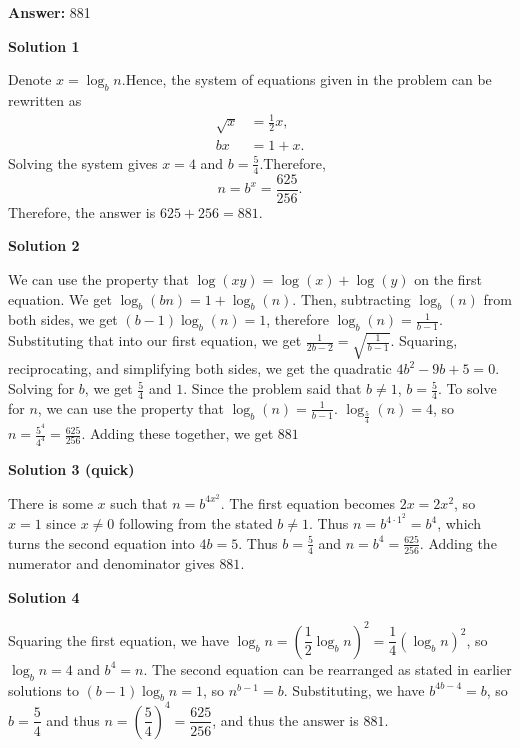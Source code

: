 \begin{enumerate}
 \textbf{Answer: }881



\textbf{Solution 1}

Denote $x = \log_b n$.Hence, the system of equations given in the problem can be rewritten as
 \begin{align*} \sqrt{x} & = \frac{1}{2} x , \\ bx & = 1 + x . \end{align*}
Solving the system gives $x = 4$ and $b = \frac{5}{4}$.Therefore,
 \[n = b^x = \frac{625}{256}.\]Therefore, the answer is $625 + 256 = \boxed{881}$.

 



\textbf{Solution 2}

We can use the property that $\log(xy) = \log(x) + \log(y)$ on the first equation. We get $\log_b(bn) = 1 + \log_b(n)$. Then, subtracting $\log_b(n)$ from both sides, we get $(b-1) \log_b(n) = 1$, therefore $\log_b(n) = \frac{1}{b-1}$. Substituting that into our first equation, we get $\frac{1}{2b-2} = \sqrt{\frac{1}{b-1}}$. Squaring, reciprocating, and simplifying both sides, we get the quadratic $4b^2 - 9b + 5 = 0$. Solving for $b$, we get $\frac{5}{4}$ and $1$. Since the problem said that $b \neq 1$, $b = \frac{5}{4}$. To solve for $n$, we can use the property that $\log_b(n) = \frac{1}{b-1}$. $\log_\frac{5}{4}(n) = 4$, so $n = \frac{5^4}{4^4} = \frac{625}{256}$. Adding these together, we get $\boxed{881}$




\textbf{Solution 3 (quick)}

There is some $x$ such that $n=b^{4x^2}$. The first equation becomes $2x=2x^2$, so $x=1$ since $x\ne 0$ following from the stated $b\ne 1$. Thus $n=b^{4\cdot 1^2}=b^4$, which turns the second equation into $4b=5$. Thus $b=\frac{5}{4}$ and $n= b^4=\frac{625}{256}$. Adding the numerator and denominator gives $\boxed{881}$.

 



\textbf{Solution 4}

Squaring the first equation, we have $\log_b{n}=\left(\dfrac{1}{2}\log_b{n}\right)^2=\dfrac{1}{4}(\log_b{n})^2$, so $\log_b{n}=4$ and $b^4=n$. The second equation can be rearranged as stated in earlier solutions to $(b-1)\log_b{n}=1$, so $n^{b-1}=b$. Substituting, we have $b^{4b-4}=b$, so $b=\dfrac{5}{4}$ and thus $n=\left(\dfrac{5}{4}\right)^4=\dfrac{625}{256}$, and thus the answer is $\boxed{881.}$





\end{enumerate}
